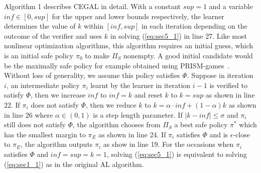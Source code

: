 Algorithm 1 describes CEGAL in detail. 
With a constant $sup=1$ and a variable $inf\in[0, sup]$ for the upper and lower bounds respectively, the learner determines the value of $k$ within $[inf, sup]$ in each iteration depending on the outcome of the verifier and uses $k$ in solving (\ref{eq:sec5_1}) in line 27. 
Like most nonlinear optimization algorithms, this algorithm requires an initial guess, which is an initial safe policy $\pi_0$ to make $\Pi_S$ nonempty. A good initial candidate would be the maximally safe policy for example obtained using PRISM-games~{\cite{Kwiatkowska2017}}. 
Without loss of generality, we assume this policy satisfies $\Phi$.
Suppose in iteration $i$, an intermediate policy $\pi_i$ learnt by the learner in iteration $i-1$ is verified to satisfy $\Phi$, then we increase $inf$ to $inf=k$ and reset $k$ to $k=sup$ as shown in line 22. 
If $\pi_i$ does not satisfy $\Phi$, then we reduce $k$ to $k=\alpha\cdot inf + (1 - \alpha)k$  as shown in line 26 where $\alpha\in(0, 1)$ is a step length parameter. 
If $|k-inf|\leq\sigma$ and $\pi_i$ still does not satisfy $\Phi$, the algorithm chooses from $\Pi_S$ a best safe policy $\pi^*$ which has the smallest margin to $\pi_E$ as shown in line 24. If $\pi_i$ satisfies $\Phi$ and is {$\epsilon$-close} to $\pi_E$, the algorithm outputs $\pi_i$ as show in line 19. For the occasions when $\pi_i$ satisfies $\Phi$ and $inf = sup = k = 1$, solving (\ref{eq:sec5_1}) is equivalent to solving (\ref{eq:sec1_1}) as in the original AL algorithm.
